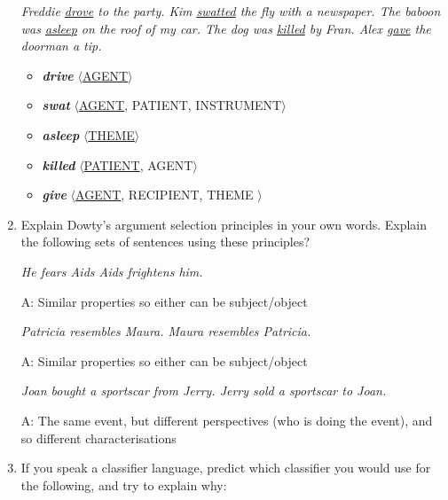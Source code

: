 \documentclass[a4paper]{article}
\newcommand{\lex}[1]{\textbf{\textit{#1}}}
\newcommand{\ix}{\ex\it}
\newcommand{\ul}[1]{\uline{#1}}
\begin{document}
\begin{enumerate}
  \begin{exe}
    \ix Freddie \ul{drove} to the party.
    \ix Kim \ul{swatted} the fly with a newspaper.
    \ix The baboon was \ul{asleep} on the roof of my car.
    \ix The dog was \ul{killed} by Fran.
    \ix Alex \ul{gave} the doorman a tip.
  \end{exe}

  \begin{itemize}
  \item \lex{drive}  $\langle$\ul{AGENT}$\rangle$
  \item \lex{swat}  $\langle$\ul{AGENT}, PATIENT, INSTRUMENT$\rangle$
  \item \lex{asleep} $\langle$\ul{THEME}$\rangle$
  \item \lex{killed} $\langle$\ul{PATIENT}, AGENT$\rangle$
  \item \lex{give} $\langle$\ul{AGENT}, RECIPIENT, THEME $\rangle$
  \end{itemize}
  
  \newpage
  
\item Explain Dowty's argument selection principles in your own
  words. Explain the following sets of sentences using these principles?

\begin{exe}
    \ex
    \begin{xlist}
      \ix He fears Aids
      \ix Aids frightens him.
    \end{xlist}
    \trans A: Similar properties so either can be subject/object
    \ex
    \begin{xlist}
      \ix Patricia resembles Maura.
      \ix Maura resembles Patricia.
    \end{xlist}
    \trans A: Similar properties so either can be subject/object
    \ex
    \begin{xlist}
      \ix Joan bought a sportscar from Jerry.
      \ix Jerry sold a sportscar to Joan. 
    \end{xlist}
    \trans A: The same event, but different perspectives (who is doing
    the event), and so different characterisations
  \end{exe}


\item If you speak a classifier language, predict which classifier you
  would use for the following, and try to explain why:


\end{enumerate}
\end{document}
